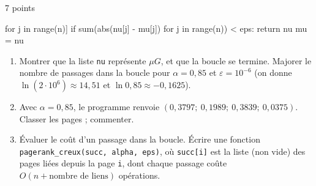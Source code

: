 \begin{exoEval}{7 points}{}
\begin{questions}[start=9]
\begin{python}
              for j in range(n)]
        if sum(abs(nu[j] - mu[j]) for j in range(n)) < eps:
            return nu
        mu = nu
\end{python}
    \begin{enumerate}[label=\alph*)]
      \item Montrer que la liste \texttt{nu} représente $\mu G$, et que la
        boucle se termine. Majorer le nombre de passages dans la boucle pour
        $\alpha=0{,}85$ et $\varepsilon=10^{-6}$ (on donne
        $\ln(2\cdot10^{6})\approx14{,}51$ et $\ln0{,}85\approx-0{,}1625$).
      \item Avec $\alpha=0{,}85$, le programme renvoie
        $(0{,}3797;\ 0{,}1989;\ 0{,}3839;\ 0{,}0375)$. Classer les pages ;
        commenter.
      \item Évaluer le coût d'un passage dans la boucle. Écrire une fonction
        \texttt{pagerank\_creux(succ, alpha, eps)}, où \texttt{succ[i]} est
        la liste (non vide) des pages liées depuis la page \texttt{i}, dont
        chaque passage coûte $O(n+\text{nombre de liens})$ opérations.
    \end{enumerate}
\end{questions}
\end{exoEval}
